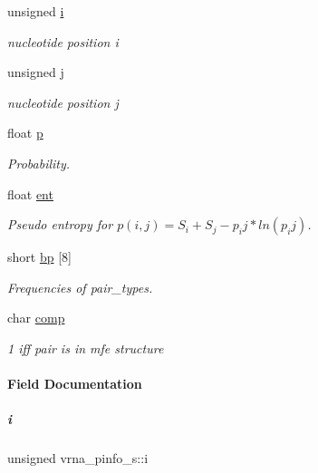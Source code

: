 \begin{DoxyCompactItemize}
\item 
unsigned \mbox{\hyperlink{group__aln__utils_ab91db0a87ef8402dc151795ba5a64c6f}{i}}
\begin{DoxyCompactList}\small\item\em nucleotide position i \end{DoxyCompactList}\item 
unsigned \mbox{\hyperlink{group__aln__utils_a4142e38d6ba127acccdf680300a88e1f}{j}}
\begin{DoxyCompactList}\small\item\em nucleotide position j \end{DoxyCompactList}\item 
float \mbox{\hyperlink{group__aln__utils_a71990eae41fa100db8b557e4512ec281}{p}}
\begin{DoxyCompactList}\small\item\em Probability. \end{DoxyCompactList}\item 
float \mbox{\hyperlink{group__aln__utils_a5ab2a63f3da8e12c6d54d8e9dd9e3e73}{ent}}
\begin{DoxyCompactList}\small\item\em Pseudo entropy for $ p(i,j) = S_i + S_j - p_ij*ln(p_ij) $. \end{DoxyCompactList}\item 
short \mbox{\hyperlink{group__aln__utils_aa5feac5559b36dcd7cb38111c45d444d}{bp}} \mbox{[}8\mbox{]}
\begin{DoxyCompactList}\small\item\em Frequencies of pair\+\_\+types. \end{DoxyCompactList}\item 
char \mbox{\hyperlink{group__aln__utils_a0720ae74ce53802a759ee9f98e9c8c43}{comp}}
\begin{DoxyCompactList}\small\item\em 1 iff pair is in mfe structure \end{DoxyCompactList}\end{DoxyCompactItemize}


\paragraph{Field Documentation}
\mbox{\label{group__aln__utils_ab91db0a87ef8402dc151795ba5a64c6f}} 
\subparagraph{\texorpdfstring{i}{i}}
{\footnotesize\ttfamily unsigned vrna\+\_\+pinfo\+\_\+s\+::i}



